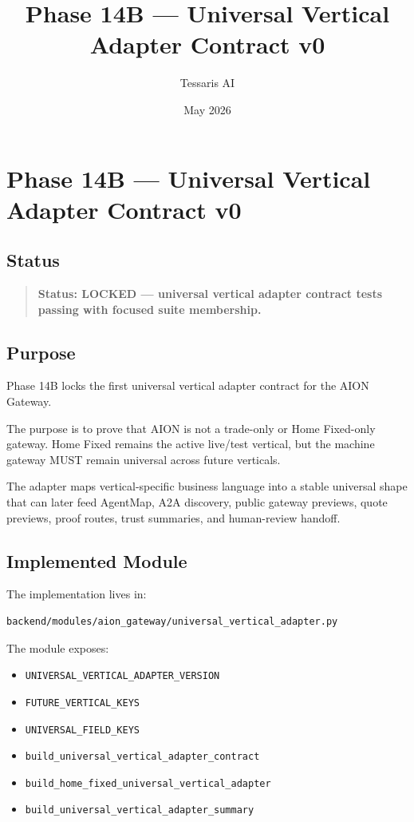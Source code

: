 \documentclass[11pt]{article}
\title{Phase 14B --- Universal Vertical Adapter Contract v0}
\author{Tessaris AI}
\date{May 2026}
\begin{document}
\maketitle

\section{Phase 14B --- Universal Vertical Adapter Contract v0}
\label{sec:phase14b-universal-vertical-adapter-contract-v0}

\subsection{Status}

\begin{quote}
\textbf{Status: LOCKED --- universal vertical adapter contract tests passing with focused suite membership.}
\end{quote}

\subsection{Purpose}

Phase 14B locks the first universal vertical adapter contract for the AION Gateway.

The purpose is to prove that AION is not a trade-only or Home Fixed-only gateway. Home Fixed remains the active live/test vertical, but the machine gateway MUST remain universal across future verticals.

The adapter maps vertical-specific business language into a stable universal shape that can later feed AgentMap, A2A discovery, public gateway previews, quote previews, proof routes, trust summaries, and human-review handoff.

\subsection{Implemented Module}

The implementation lives in:

\begin{verbatim}
backend/modules/aion_gateway/universal_vertical_adapter.py
\end{verbatim}

The module exposes:

\begin{itemize}
  \item \texttt{UNIVERSAL\_VERTICAL\_ADAPTER\_VERSION}
  \item \texttt{FUTURE\_VERTICAL\_KEYS}
  \item \texttt{UNIVERSAL\_FIELD\_KEYS}
  \item \texttt{build\_universal\_vertical\_adapter\_contract}
  \item \texttt{build\_home\_fixed\_universal\_vertical\_adapter}
  \item \texttt{build\_universal\_vertical\_adapter\_summary}
\end{itemize}
\end{document}
